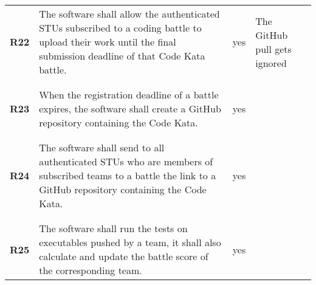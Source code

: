 \begin{longtable}[H]{l p{8cm} l p{2cm}}
    \textbf{R22} & The software shall allow the authenticated STUs subscribed to a coding battle to upload their work until the final submission deadline of that Code Kata battle.                                                      & {\color{green}yes}   & The GitHub pull gets ignored                                                            \\
                 &                                                                                                                                                                                                                       &                      &                                                                                         \\\hline & & & \\
    \textbf{R23} & When the registration deadline of a battle expires, the software shall create a GitHub repository containing the Code Kata.                                                                                           & {\color{green}yes}   &                                                                                         \\
                 &                                                                                                                                                                                                                       &                      &                                                                                         \\\hline & & & \\
    \textbf{R24} & The software shall send to all authenticated STUs who are members of subscribed teams to a battle the link to a GitHub repository containing the Code Kata.                                                           & {\color{green}yes}   &                                                                                         \\
                 &                                                                                                                                                                                                                       &                      &                                                                                         \\\hline & & & \\
    \textbf{R25} & The software shall run the tests on executables pushed by a team, it shall also calculate and update the battle score of the corresponding team.                                                                      & {\color{green}yes}   &                                                                                         \\

\end{longtable}
